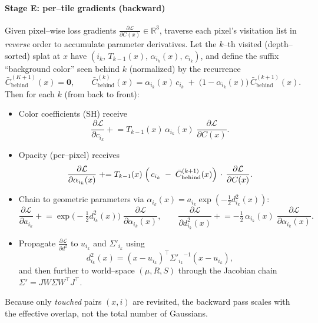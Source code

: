 \begin{enrichment}
\begin{enrichment}
\begin{enrichment}
        \paragraph{Stage E: per–tile gradients (backward)}
        Given pixel–wise loss gradients $\frac{\partial \mathcal{L}}{\partial C(x)}\in\mathbb{R}^3$, traverse each pixel’s visitation list in \emph{reverse} order to accumulate parameter derivatives. Let the $k$–th visited (depth–sorted) splat at $x$ have $(i_k,\,T_{k-1}(x),\,\alpha_{i_k}(x),\,c_{i_k})$, and define the suffix “background color” seen behind $k$ (normalized) by the recurrence
        \[
        \bar C_{\text{behind}}^{(K+1)}(x)=\mathbf{0},\qquad
        \bar C_{\text{behind}}^{(k)}(x)=\alpha_{i_k}(x)\,c_{i_k}\;+\;\bigl(1-\alpha_{i_k}(x)\bigr)\,\bar C_{\text{behind}}^{(k+1)}(x).
        \]
        Then for each $k$ (from back to front):
        \begin{itemize}
            \item Color coefficients (SH) receive
            \[
            \frac{\partial \mathcal{L}}{\partial c_{i_k}} \mathrel{+}= T_{k-1}(x)\,\alpha_{i_k}(x)\;\frac{\partial \mathcal{L}}{\partial C(x)}.
            \]
            \item Opacity (per–pixel) receives
            \[
            \frac{\partial \mathcal{L}}{\partial \alpha_{i_k}(x)} \mathrel{+}= 
            T_{k-1}(x)\;\Bigl(\,c_{i_k}\;-\;\bar C_{\text{behind}}^{(k+1)}(x)\Bigr)\,\cdot\,\frac{\partial \mathcal{L}}{\partial C(x)}.
            \]
            \item Chain to geometric parameters via $\alpha_{i_k}(x)=a_{i_k}\exp(-\tfrac12 d_{i_k}^2(x))$:
            \[
            \frac{\partial \mathcal{L}}{\partial a_{i_k}} \mathrel{+}= \exp\!\bigl(-\tfrac12 d_{i_k}^2(x)\bigr)\;\frac{\partial \mathcal{L}}{\partial \alpha_{i_k}(x)},\qquad
            \frac{\partial \mathcal{L}}{\partial d_{i_k}^2(x)} \mathrel{+}= -\tfrac12\,\alpha_{i_k}(x)\;\frac{\partial \mathcal{L}}{\partial \alpha_{i_k}(x)}.
            \]
            \item Propagate $\frac{\partial \mathcal{L}}{\partial d^2}$ to $u_{i_k}$ and $\Sigma'_{i_k}$ using
            \[
            d_{i_k}^2(x)=(x-u_{i_k})^\top{\Sigma'_{i_k}}^{-1}(x-u_{i_k}),
            \]
            and then further to world–space $(\mu,R,S)$ through the Jacobian chain $\Sigma' = J W \Sigma W^\top J^\top$.
        \end{itemize}
        Because only \emph{touched} pairs $(x,i)$ are revisited, the backward pass scales with the effective overlap, not the total number of Gaussians.
        

\end{enrichment}
\end{enrichment}
\end{enrichment}
